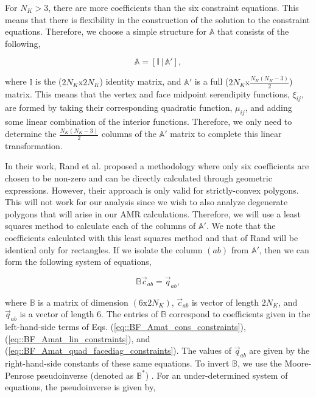 \noindent For $N_K > 3$, there are more coefficients than the six constraint equations. This means that there is flexibility in the construction of the solution to the constraint equations. Therefore, we choose a simple structure for $\mathbb{A}$ that consists of the following,


\begin{equation}
\label{eq::BF_quad_Amat_simple}
\mathbb{A} = \left[ \mathbb{I} \, | \, \mathbb{A}' \right],
\end{equation}

\noindent where $\mathbb{I}$ is the ($2 N_K \text{x} 2 N_K$) identity matrix, and $\mathbb{A}'$ is a full ($2 N_K \text{x}  \frac{N_K(N_K-3)}{2}$) matrix. This means that the vertex and face midpoint serendipity functions, $\xi_{ij}$, are formed by taking their corresponding quadratic function, $\mu_{ij}$, and adding some linear combination of the interior functions. Therefore, we only need to determine the $\frac{N_K(N_K-3)}{2}$ columns of the $\mathbb{A}'$ matrix to complete this linear transformation. 

In their work, Rand et al. proposed a methodology where only six coefficients are chosen to be non-zero and can be directly calculated through geometric expressions. However, their approach is only valid for strictly-convex polygons. This will not work for our analysis since we wish to also analyze degenerate polygons that will arise in our AMR calculations. Therefore, we will use a least squares method to calculate each of the columns of $\mathbb{A}'$. We note that the coefficients calculated with this least squares method and that of Rand will be identical only for rectangles. If we isolate the column $(ab)$ from $\mathbb{A}'$, then we can form the following system of equations, 

\begin{equation}
\label{eq::BF_quad_MP_form}
\mathbb{B} \vec{c}_{ab} = \vec{q}_{ab}, 
\end{equation}

\noindent where $\mathbb{B}$ is a matrix of dimension $(6 \text{x} 2 N_K)$, $\vec{c}_{ab}$ is vector of length $2 N_K$, and $\vec{q}_{ab}$ is a vector of length 6. The entries of $\mathbb{B}$ correspond to coefficients given in the left-hand-side terms of Eqs. (\ref{eq::BF_Amat_cons_constraints}), (\ref{eq::BF_Amat_lin_constraints}), and (\ref{eq::BF_Amat_quad_facediag_constraints}). The values of $\vec{q}_{ab}$ are given by the right-hand-side constants of these same equations. To invert $\mathbb{B}$, we use the Moore-Penrose pseudoinverse (denoted as $\mathbb{B}^*$) \cite{penrose1955generalized}. For an under-determined system of equations, the pseudoinverse is given by,

